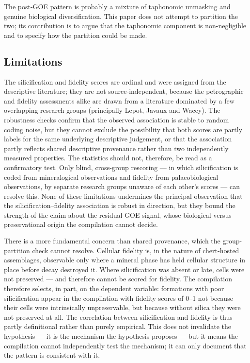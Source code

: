 \documentclass[11pt]{article}
\begin{document}
The post-GOE pattern is probably a mixture of taphonomic unmasking and genuine biological
diversification. This paper does not attempt to partition the two; its contribution is to argue that
the taphonomic component is non-negligible and to specify how the partition could be made.

\subsection{Limitations}

The silicification and fidelity scores are ordinal and were assigned from the descriptive
literature; they are not source-independent, because the petrographic and fidelity assessments alike
are drawn from a literature dominated by a few overlapping research groups (principally Lepot, Javaux
and Wacey). The robustness checks confirm that the observed association is stable to random coding
noise, but they cannot exclude the possibility that both scores are partly labels for the same
underlying descriptive judgement, or that the association partly reflects shared descriptive
provenance rather than two independently measured properties. The statistics should not, therefore,
be read as a confirmatory test. Only blind, cross-group rescoring --- in which silicification is
coded from mineralogical observations and fidelity from palaeobiological observations, by separate
research groups unaware of each other's scores --- can resolve this. None of these limitations
undermines the principal observation that the silicification--fidelity association is robust in
direction, but they bound the strength of the claim about the residual GOE signal, whose biological
versus preservational origin the compilation cannot decide.

There is a more fundamental concern than shared provenance, which the group-partition check cannot
resolve. Cellular fidelity is, in the nature of chert-hosted assemblages, observable only where a
mineral phase has held cellular structure in place before decay destroyed it. Where silicification
was absent or late, cells were not preserved --- and therefore cannot be scored for fidelity. The
compilation therefore selects, in part, on the dependent variable: formations with poor
silicification appear in the compilation with fidelity scores of 0--1 not because their cells were
intrinsically unpreservable, but because without silica they were not preserved at all. The
correlation between silicification and fidelity is thus partly definitional rather than purely
empirical. This does not invalidate the hypothesis --- it is the mechanism the hypothesis proposes
--- but it means the compilation cannot independently test the mechanism; it can only document that
the pattern is consistent with it.
\end{document}
